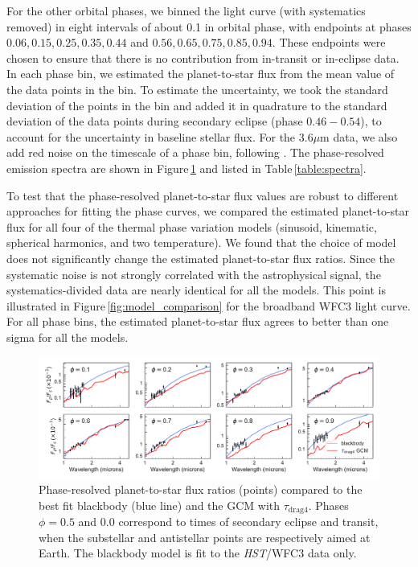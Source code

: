 \documentclass[twocolumn]{aastex61}
\newcommand{\project}[1]{\textsl{#1}}
\newcommand{\HST}{\project{HST}}
\begin{document}
For the other orbital phases, we binned the light curve (with systematics removed) in eight intervals of about 0.1 in orbital phase, with endpoints at phases $0.06, 0.15, 0.25, 0.35, 0.44$ and $0.56, 0.65, 0.75, 0.85, 0.94$. These endpoints were chosen to ensure that there is no contribution from in-transit or in-eclipse data.  In each phase bin, we estimated the planet-to-star flux from the mean value of the data points in the bin. To estimate the uncertainty, we took the standard deviation of the points in the bin and added it in quadrature to the standard deviation of the data points during secondary eclipse (phase $0.46-0.54$), to account for the uncertainty in baseline stellar flux.  For the $3.6\mu$m data, we also add red noise on the timescale of a phase bin, following \cite{pont06}.  The phase-resolved emission spectra are shown in Figure\,\ref{fig:spectra} and listed in Table\,\ref{table:spectra}. 

To test that the phase-resolved planet-to-star flux values are robust to different approaches for fitting the phase curves, we compared the estimated planet-to-star flux for all four of the thermal phase variation models (sinusoid, kinematic, spherical harmonics, and two temperature). We found that the choice of model does not significantly change the estimated planet-to-star flux ratios.  Since the systematic noise is not strongly correlated with the astrophysical signal, the systematics-divided data are nearly identical for all the models.  This point is illustrated in Figure\,\ref{fig:model_comparison} for the broadband WFC3 light curve. For all phase bins, the estimated planet-to-star flux agrees to better than one sigma for all the models.

\begin{figure}
\includegraphics[width = 1.0\textwidth]{Figures/emission_spectra.pdf}
\caption{Phase-resolved planet-to-star flux ratios (points) compared to the best fit blackbody (blue line) and the GCM with $\tau_\mathrm{drag4}$. Phases $\phi=0.5$ and $0.0$ correspond to times of secondary eclipse and transit, when the substellar and antistellar points are respectively aimed at Earth. The blackbody model is fit to the \HST/WFC3 data only.}
\label{fig:spectra}
\end{figure}
\end{document}
